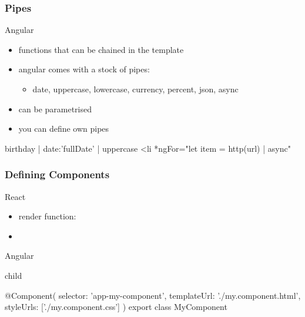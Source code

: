 \begin{frame}[fragile] \frametitle{Pipes}
Angular
\begin{itemize}
  \item functions that can be chained in the template
  \item angular comes with a stock of pipes:
  \begin{itemize}
    \item  date, uppercase, lowercase, currency, percent, json, async
  \end{itemize}
  \item can be parametrised
  \item you can define own pipes
\end{itemize}
\begin{CodeBox}{}
{{  birthday | date:'fullDate' | uppercase}}
{{  <li *ngFor="let item = http(url) | async"}}
\end{CodeBox}
\end{frame}

\begin{frame}[fragile] \frametitle{Defining Components}
React
\begin{itemize}
  \item render function: 
  \item {}\\
    \hspace{3mm} 
\end{itemize}
\vspace{1mm}
Angular
\begin{CodeBox}{child}

@Component({
  selector: 'app-my-component',
  templateUrl: './my.component.html',
  styleUrls: ['./my.component.css']
})
export class MyComponent { }
\end{CodeBox}
\end{frame}


